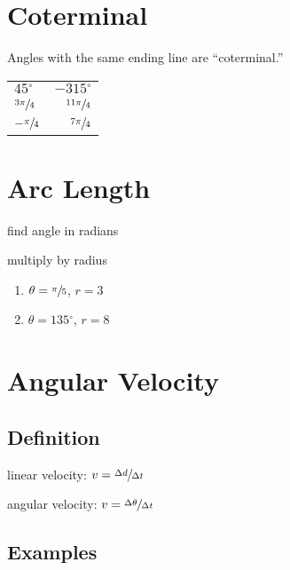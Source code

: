 \documentclass{exam}
\newcommand{\dg}{\ensuremath{^\circ}}
\begin{document}
  \section{Coterminal}
  Angles with the same ending line are ``coterminal.''

  \begin{tabular}[H]{lr}
    \toprule
    $45 \dg$             & $-315 \dg$ \\
    $\sfrac{3 \pi}{4}$   & $\sfrac{11 \pi}{4}$ \\
    $- \sfrac{\pi}{4}$   & $\sfrac{7 \pi}{4}$ \\
    \bottomrule
  \end{tabular}

  \section{Arc Length}

  \begin{itemize*}
    \item find angle in radians
    \item multiply by radius
  \end{itemize*}

  \begin{enumerate}
    \item $\theta = \sfrac{\pi}{5}$, $r = 3$
    \item $\theta = 135 \dg$, $r = 8$
  \end{enumerate}

  \section{Angular Velocity}

  \subsection{Definition}
  \begin{itemize*}
    \item linear velocity: $v = \sfrac{\Delta d}{\Delta t}$
    \item angular velocity: $v = \sfrac{\Delta \theta}{\Delta t}$
  \end{itemize*}

  \subsection{Examples}
\end{document}
